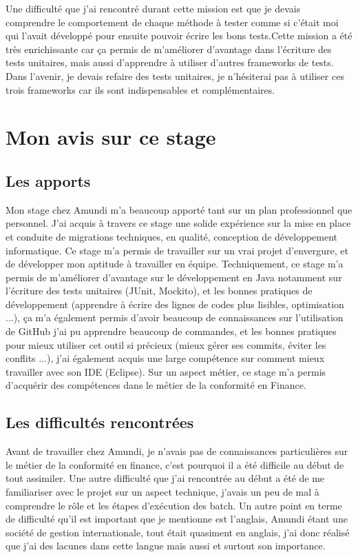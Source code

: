 \documentclass[12pt,a4paper]{report}
\begin{document}
Une difficulté que j'ai rencontré durant cette mission est que je devais comprendre le comportement de chaque méthode à tester comme si c'était moi qui l'avait développé pour ensuite pouvoir écrire les bons tests.\newline Cette mission a été très enrichissante car ça permis de m'améliorer d'avantage dans l'écriture des tests unitaires, mais aussi d'apprendre à utiliser d'autres frameworks de tests. Dans l'avenir, je devais refaire des tests unitaires, je n'hésiterai pas à utiliser ces trois frameworks car ils sont indispensables et complémentaires.
\newpage
\section{\textbf{Mon avis sur ce stage}}

\subsection{Les apports} 
Mon stage chez Amundi m'a beaucoup apporté tant sur un plan professionnel que personnel. J'ai acquis à travers ce stage une solide expérience sur la mise en place et conduite de migrations techniques, en qualité, conception de développement informatique. Ce stage m'a permis de travailler sur un vrai projet d'envergure, et de développer 
mon aptitude à travailler en équipe.
Techniquement, ce stage m'a permis de m'améliorer d'avantage sur le développement en Java notamment sur l'écriture des tests 
unitaires (JUnit, Mockito), et les bonnes pratiques de développement (apprendre à écrire des lignes de codes plus lisibles, optimisation ...), ça m'a également permis d'avoir beaucoup de connaissances sur l'utilisation de GitHub j'ai pu apprendre beaucoup de commandes, et les bonnes pratiques pour 
mieux utiliser cet outil si précieux (mieux gérer ses commits, éviter les conflits ...), j'ai également acquis une large compétence sur comment mieux travailler avec son IDE (Eclipse).
Sur un aspect métier, ce stage m'a permis d'acquérir des compétences dans le métier de la conformité en Finance.
\subsection{Les difficultés rencontrées} 
Avant de travailler chez Amundi, je n’avais pas de connaissances particulières sur le métier de la conformité en finance, c’est pourquoi il a été difficile au début de tout assimiler. 
Une autre difficulté que j'ai rencontrée au début a été de me familiariser avec le projet sur un aspect technique, j'avais un peu de mal à comprendre le rôle et les étapes d'exécution des batch.\newline
Un autre point en terme de difficulté qu'il est important que je mentionne est l'anglais, Amundi étant une société de gestion internationale, tout était quasiment en anglais, j'ai donc réalisé que j'ai des lacunes dans cette langue mais aussi et surtout son importance.
\newpage
\end{document}
